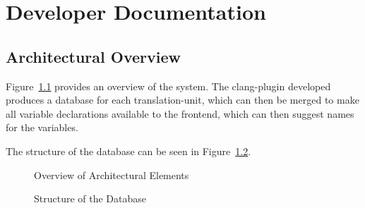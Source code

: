 \chapter{Developer Documentation}
\label{chapter:DevDoc}

\section{Architectural Overview}
\label{sec:Arch}

Figure~\ref{fig:Arch} provides an overview of the system. The clang-plugin
developed produces a database for each translation-unit, which can then be
merged to make all variable declarations available to the frontend, which can
then suggest names for the variables.

The structure of the database can be seen in Figure~\ref{fig:Database}.

\newcommand{\stereorelation}[5]{
	#1[#3]{#4}{#5}
	#1[arg1=$\ll$#2$\gg$, pos1=0.5]{#4}{#5}
}

\begin{figure}
	\label{fig:Arch}
	\caption{Overview of Architectural Elements}
	\begin{center}
	\end{center}
\end{figure}

\begin{figure}
	\label{fig:Database}
	\caption{Structure of the Database}
	\begin{center}
	\end{center}
\end{figure}


